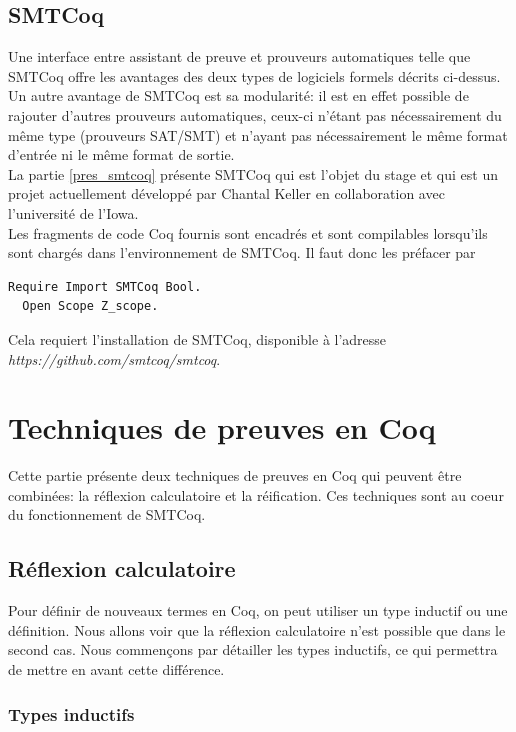 \documentclass[11pt]{article}
\begin{document}
\subsection{SMTCoq}

Une interface entre assistant de preuve et prouveurs automatiques telle que SMTCoq offre les avantages des deux types de logiciels formels décrits ci-dessus. Un autre avantage de SMTCoq est sa modularité: il est en effet possible de rajouter d'autres prouveurs automatiques, ceux-ci n'étant pas nécessairement du même type (prouveurs SAT/SMT) et n'ayant pas nécessairement le même format d'entrée ni le même format de sortie. \\


La partie \ref{pres_smtcoq} présente SMTCoq qui est l'objet du stage et qui est un projet actuellement développé par Chantal Keller en collaboration avec l'université de l'Iowa. \\

Les fragments de code Coq fournis sont encadrés et sont compilables lorsqu'ils sont chargés dans l'environnement de SMTCoq. Il faut donc les préfacer par
\begin{lstlisting}[frame=single]
  Require Import SMTCoq Bool.
  Open Scope Z_scope.
\end{lstlisting}
Cela requiert l'installation de SMTCoq, disponible à l'adresse \textit{https://github.com/smtcoq/smtcoq}.


\newpage

\section{Techniques de preuves en Coq} \label{coq}

Cette partie présente deux techniques de preuves en Coq qui peuvent être combinées: la réflexion calculatoire et la réification. Ces techniques sont au coeur du fonctionnement de SMTCoq.


\subsection{Réflexion calculatoire}

Pour définir de nouveaux termes en Coq, on peut utiliser un type inductif ou une définition. Nous allons voir que la réflexion calculatoire n'est possible que dans le second cas. Nous commençons par détailler les types inductifs, ce qui permettra de mettre en avant cette différence.

\subsubsection{Types inductifs}
\end{document}
